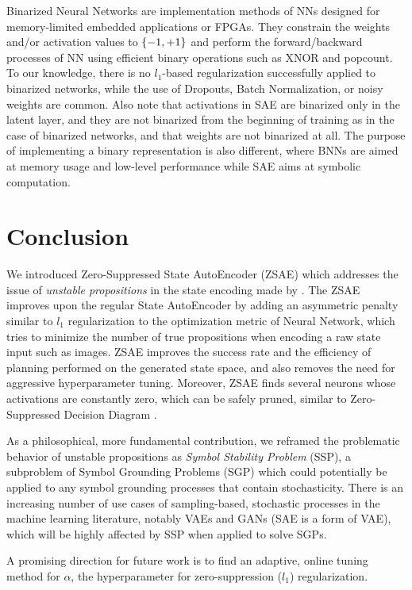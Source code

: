 
Binarized Neural Networks \cite{courbariaux2015binaryconnect,HubaraCSEB16,rastegari2016xnor}
 are implementation methods of NNs designed for
memory-limited embedded applications or FPGAs. They constrain the weights and/or activation
values to ${\left\{-1,+1\right\}}$ and perform the forward/backward processes of NN using
efficient binary operations such as XNOR and popcount.
To our knowledge, there is no $l_1$-based regularization successfully
applied to binarized networks, while the use of Dropouts, Batch Normalization, 
or noisy weights \cite{HubaraCSEB16} are common.
Also note that activations in SAE are binarized only in the latent layer,
and they are not binarized from the beginning of training
 as in the case of binarized networks, and that weights are not binarized at all.
The purpose of implementing a binary representation is also different, where BNNs
are aimed at memory usage and low-level performance while SAE aims at symbolic computation.

\section{Conclusion}
\label{conclusion}

We introduced Zero-Suppressed State AutoEncoder (ZSAE) which addresses
the issue of \emph{unstable propositions} in the state encoding made by
\latentplanner.
% 
The ZSAE improves upon the
regular State AutoEncoder \cite[SAE]{Asai2018} by
adding an asymmetric penalty similar to $l_1$ regularization to the optimization metric of
Neural Network, which tries to minimize the number of true propositions
when encoding a raw state input such as images.
% 
ZSAE improves the success rate and the efficiency of planning performed on
the generated state space, and also removes the need for aggressive
hyperparameter tuning.
% 
Moreover, 
ZSAE finds several neurons whose activations are constantly zero,
which can be safely pruned,
similar to Zero-Suppressed Decision Diagram \cite{minato1993zero}.

As a philosophical, more fundamental contribution,
we reframed the problematic behavior of unstable propositions
as \emph{Symbol Stability Problem} (SSP), a subproblem of Symbol Grounding Problems (SGP)
which could potentially be applied to any symbol grounding processes that contain stochasticity.
% 
There is an increasing number of use cases of sampling-based, stochastic processes in
the machine learning literature, notably VAEs and GANs (SAE is a form of VAE),
which will be highly affected by SSP when applied to solve SGPs.

A promising direction for future work is to 
find an adaptive, online tuning method for $\alpha$, the hyperparameter for
zero-suppression ($l_1$) regularization.

